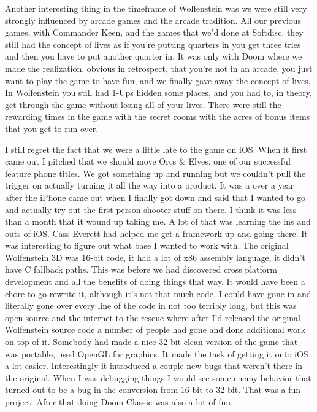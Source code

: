 Another interesting thing in the timeframe of Wolfenstein was we were still very strongly influenced by arcade games and the arcade tradition. All our previous games, with Commander Keen, and the games that we'd done at Softdisc, they still had the concept of lives as if you're putting quarters in you get three tries and then you have to put another quarter in. It was only with Doom where we made the realization, obvious in retrospect, that you're not in an arcade, you just want to play the game to have fun, and we finally gave away the concept of lives. In Wolfenstein you still had 1-Ups hidden some places, and you had to, in theory, get through the game without losing all of your lives. There were still the rewarding times in the game with the secret rooms with the acres of bonus items that you get to run over.\\ \par 

I still regret the fact that we were a little late to the game on iOS. When it first came out I pitched that we should move Orcs \& Elves, one of our successful feature phone titles. We got something up and running but we couldn't pull the trigger on actually turning it all the way into a product. It was a over a year after the iPhone came out when I finally got down and said that I wanted to go and actually try out the first person shooter stuff on there. I think it was less than a month that it wound up taking me. A lot of that was learning the ins and outs of iOS. Cass Everett had helped me get a framework up and going there. It was interesting to figure out what base I wanted to work with. The original Wolfenstein 3D was 16-bit code, it had a lot of x86 assembly language, it didn't have C fallback paths. This was before we had discovered cross platform development and all the benefits of doing things that way. It would have been a chore to go rewrite it, although it's not that much code. I could have gone in and literally gone over every line of the code in not too terribly long, but this was open source and the internet to the rescue where after I'd released the original Wolfenstein source code a number of people had gone and done additional work on top of it. Somebody had made a nice 32-bit clean version of the game that was portable, used OpenGL for graphics. It made the task of getting it onto iOS a lot easier. Interestingly it introduced a couple new bugs that weren't there in the original. When I was debugging things I would see some enemy behavior that turned out to be a bug in the conversion from 16-bit to 32-bit. That was a fun project. After that doing Doom Classic was also a lot of fun.\\ \par

